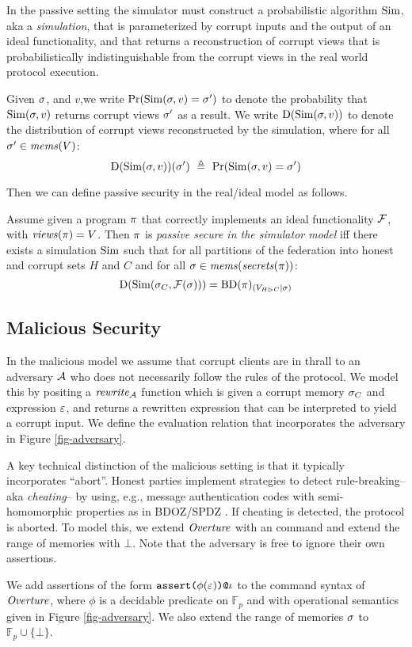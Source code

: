 In the passive setting the simulator must construct a probabilistic
algorithm $\mathrm{Sim}$, aka a \emph{simulation}, that is parameterized by
corrupt inputs and the output of an ideal functionality, and that
returns a reconstruction of corrupt views that is probabilistically
indistinguishable from the corrupt views in the real world protocol
execution.
\begin{definition}
  Given $\sigma$, and $v$,we write $ \mathrm{Pr}(\mathrm{Sim}(\sigma,v) = \sigma') $
  to denote the probability that $\mathrm{Sim}(\sigma,v)$ returns corrupt views
  $\sigma'$ as a result. We write $\mathrm{D}(\mathrm{Sim}(\sigma,v))$ to
  denote the distribution of corrupt views reconstructed by the
  simulation, where for
  all $\sigma' \in \mathit{mems}(V)$:
  $$
  \dist(\SIM(\store,v))(\store')\ \defeq\ \prob(\SIM(\store,v) = \store') 
  $$
\end{definition}
Then we can define passive security in the real/ideal
model as follows. 
\begin{definition}
  Assume given a program $\pi$ that correctly implements an ideal
  functionality $\mathcal{F}$, with $\mathit{views}(\pi) = V$.  Then $\pi$
  is \emph{passive secure in the simulator model} iff there exists
  a simulation $\mathrm{Sim}$ such that for all
  partitions of the federation into honest and corrupt sets $H$ and $C$
  and for all $\sigma \in \mathit{mems}(\mathit{secrets}(\pi))$:
  $$
  \mathrm{D}(\mathrm{Sim}(\sigma_{C},\mathcal{F}(\sigma))) = \mathrm{BD}(\pi)_{({V_{H \rhd C}}|{\sigma})}
  $$
\end{definition}

\subsection{Malicious Security}

In the malicious model we assume that corrupt clients are in
thrall to an adversary $\mathcal{A}$ who does not necessarily follow
the rules of the protocol.  We model this by positing a $\mathit{rewrite}_{\mathcal{A}}$
function which is given a corrupt memory $\sigma_C$ and expression
$\varepsilon$, and returns a rewritten expression that can be interpreted to
yield a corrupt input. We define the evaluation relation that
incorporates the adversary in Figure \ref{fig-adversary}.

\adversaryfig

A key technical distinction of the malicious setting is that it
typically incorporates ``abort''. Honest parties implement strategies
to detect rule-breaking-- aka \emph{cheating}-- by using, e.g.,
message authentication codes with semi-homomorphic properties as in
BDOZ/SPDZ \cite{10.1007/978-3-030-68869-1_3}. If cheating is detected,
the protocol is aborted. To model this, we extend $\mathit{Overture}$ with an
 command and extend the range of memories with
$\bot$. Note that the adversary is free to ignore their own
assertions.
\begin{definition}
  We add assertions of the form $\texttt{assert(}\phi(\varepsilon)\texttt{)}\texttt{@}\iota$ to the command
  syntax of $\mathit{Overture}$, where $\phi$ is a decidable predicate on
  $\mathbb{F}_p$ and with operational semantics given in Figure
  \ref{fig-adversary}. We also extend the range of memories $\sigma$
  to $\mathbb{F}_p \cup \{ \bot \}$.
\end{definition}

